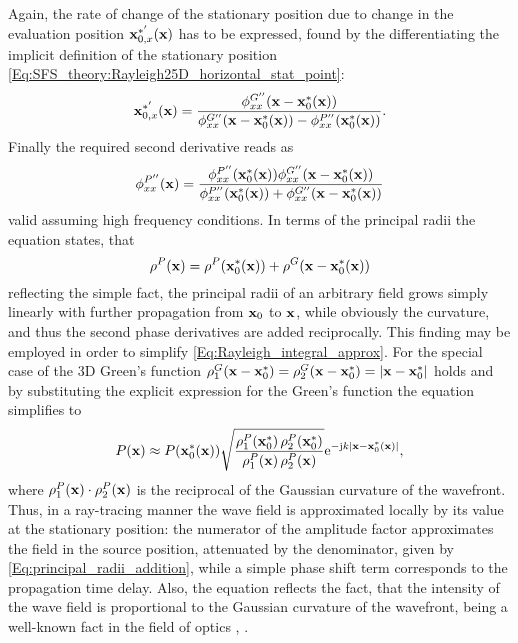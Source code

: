 Again, the rate of change of the stationary position due to change in the evaluation position $\mathbf{x}^{*'}_{0,x}(\mathbf{x})$ has to be expressed, found by the differentiating the implicit definition of the stationary position \eqref{Eq:SFS_theory:Rayleigh25D_horizontal_stat_point}:
\begin{equation}
\mathbf{x}^{*'}_{0,x}(\mathbf{x}) = \frac{\phi^{G''}_{xx}(\mathbf{x} - \mathbf{x}_0^*(\mathbf{x}))}{ \phi^{G''}_{xx}(\mathbf{x} - \mathbf{x}_0^*(\mathbf{x}))  -   \phi^{P''}_{xx}(\mathbf{x}_0^*(\mathbf{x}))}.
\end{equation}
Finally the required second derivative reads as
\begin{equation}
\label{Eq:Asymptotic_second_derivatives}
\phi^{P''}_{xx}(\mathbf{x}) = \frac{\phi^{P''}_{xx}(\mathbf{x}_0^*(\mathbf{x})) \phi^{G''}_{xx}(\mathbf{x}- \mathbf{x}_0^*(\mathbf{x}))}
{\phi^{P''}_{xx}(\mathbf{x}_0^*(\mathbf{x})) + \phi^{G''}_{xx}(\mathbf{x}- \mathbf{x}_0^*(\mathbf{x}))}
\end{equation}
valid assuming high frequency conditions.
In terms of the principal radii the equation states, that
\begin{equation}
\label{Eq:principal_radii_addition}
\rho^P(\mathbf{x})=  \rho^P(\mathbf{x}_0^*(\mathbf{x})) + \rho^G(\mathbf{x}-\mathbf{x}_0^*(\mathbf{x}))
\end{equation}
reflecting the simple fact, the principal radii of an arbitrary field grows simply linearly with further propagation from $\mathbf{x}_0$ to $\mathbf{x}$, while obviously the curvature, and thus the second phase derivatives are added reciprocally.
This finding may be employed in order to simplify \eqref{Eq:Rayleigh_integral_approx}.
For the special case of the 3D Green's function $\rho^G_1(\mathbf{x}-\mathbf{x}_0^*) = \rho^G_2(\mathbf{x}-\mathbf{x}_0^*) = |\mathbf{x}-\mathbf{x}_0^*|$ holds and by substituting the explicit expression for the Green's function the equation simplifies to
\begin{equation}
P(\mathbf{x}) \approx 
P(\mathbf{x}_0^*(\mathbf{x}))
\sqrt{ \frac{\rho^P_1(\mathbf{x}_0^*) \, \rho^P_2(\mathbf{x}_0^*)}{\rho^P_1(\mathbf{x}) \, \rho^P_2(\mathbf{x})} }
\mathrm{e}^{-\mathrm{j} k |\mathbf{x}-\mathbf{x}_0^*(\mathbf{x})|},
\end{equation}
where $\rho^P_1(\mathbf{x}) \cdot \rho^P_2(\mathbf{x})$ is the reciprocal of the Gaussian curvature of the wavefront.
Thus, in a ray-tracing manner the wave field is approximated locally by its value at the stationary position: the numerator of the amplitude factor approximates the field in the source position, attenuated by the denominator, given by \eqref{Eq:principal_radii_addition}, while a simple phase shift term corresponds to the propagation time delay.
Also, the equation reflects the fact, that the intensity of the wave field is proportional to the Gaussian curvature of the wavefront, being a well-known fact in the field of optics \cite[Sec. 3.1]{Born1970}, \cite[Sec. 1.3]{Bouche1997}.

